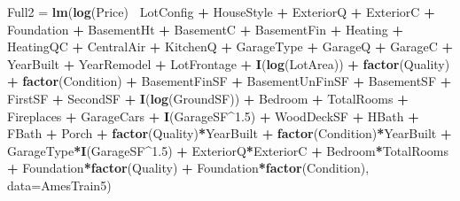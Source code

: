 \documentclass[
]{article}
\newenvironment{Shaded}{\begin{snugshade}}{\end{snugshade}}
\newcommand{\DataTypeTok}[1]{\textcolor[rgb]{0.13,0.29,0.53}{#1}}
\newcommand{\FloatTok}[1]{\textcolor[rgb]{0.00,0.00,0.81}{#1}}
\newcommand{\KeywordTok}[1]{\textcolor[rgb]{0.13,0.29,0.53}{\textbf{#1}}}
\newcommand{\NormalTok}[1]{#1}
\newcommand{\OperatorTok}[1]{\textcolor[rgb]{0.81,0.36,0.00}{\textbf{#1}}}
\newcommand{\StringTok}[1]{\textcolor[rgb]{0.31,0.60,0.02}{#1}}
\begin{document}
\begin{Shaded}
\begin{Highlighting}[]
\NormalTok{Full2 =}\StringTok{ }\KeywordTok{lm}\NormalTok{(}\KeywordTok{log}\NormalTok{(Price)}\OperatorTok{~}
\StringTok{            }\NormalTok{LotConfig }\OperatorTok{+}\StringTok{ }\NormalTok{HouseStyle }\OperatorTok{+}\StringTok{ }\NormalTok{ExteriorQ }\OperatorTok{+}\StringTok{ }\NormalTok{ExteriorC }\OperatorTok{+}\StringTok{ }\NormalTok{Foundation }\OperatorTok{+}\StringTok{ }\NormalTok{BasementHt }\OperatorTok{+}\StringTok{ }\NormalTok{BasementC }\OperatorTok{+}\StringTok{ }\NormalTok{BasementFin }\OperatorTok{+}\StringTok{ }\NormalTok{Heating }\OperatorTok{+}\StringTok{ }\NormalTok{HeatingQC }\OperatorTok{+}\StringTok{ }\NormalTok{CentralAir }\OperatorTok{+}\StringTok{ }\NormalTok{KitchenQ }\OperatorTok{+}\StringTok{ }\NormalTok{GarageType }\OperatorTok{+}\StringTok{ }\NormalTok{GarageQ }\OperatorTok{+}\StringTok{ }\NormalTok{GarageC }\OperatorTok{+}\StringTok{ }\NormalTok{YearBuilt }\OperatorTok{+}\StringTok{ }\NormalTok{YearRemodel }\OperatorTok{+}\StringTok{ }\NormalTok{LotFrontage }\OperatorTok{+}\StringTok{ }\KeywordTok{I}\NormalTok{(}\KeywordTok{log}\NormalTok{(LotArea)) }\OperatorTok{+}\StringTok{ }\KeywordTok{factor}\NormalTok{(Quality) }\OperatorTok{+}\StringTok{ }\KeywordTok{factor}\NormalTok{(Condition) }\OperatorTok{+}\StringTok{ }\NormalTok{BasementFinSF }\OperatorTok{+}\StringTok{ }\NormalTok{BasementUnFinSF }\OperatorTok{+}\StringTok{ }\NormalTok{BasementSF }\OperatorTok{+}\StringTok{ }\NormalTok{FirstSF }\OperatorTok{+}\StringTok{ }\NormalTok{SecondSF }\OperatorTok{+}\StringTok{ }\KeywordTok{I}\NormalTok{(}\KeywordTok{log}\NormalTok{(GroundSF)) }\OperatorTok{+}\StringTok{ }\NormalTok{Bedroom }\OperatorTok{+}\StringTok{ }\NormalTok{TotalRooms }\OperatorTok{+}\StringTok{ }\NormalTok{Fireplaces }\OperatorTok{+}\StringTok{ }\NormalTok{GarageCars }\OperatorTok{+}\StringTok{ }\KeywordTok{I}\NormalTok{(GarageSF}\OperatorTok{^}\FloatTok{1.5}\NormalTok{) }\OperatorTok{+}\StringTok{ }\NormalTok{WoodDeckSF }\OperatorTok{+}\StringTok{ }\NormalTok{HBath }\OperatorTok{+}\StringTok{ }\NormalTok{FBath }\OperatorTok{+}\StringTok{ }\NormalTok{Porch }\OperatorTok{+}\StringTok{ }\KeywordTok{factor}\NormalTok{(Quality)}\OperatorTok{*}\NormalTok{YearBuilt }\OperatorTok{+}\StringTok{ }\KeywordTok{factor}\NormalTok{(Condition)}\OperatorTok{*}\NormalTok{YearBuilt }\OperatorTok{+}\StringTok{ }\NormalTok{GarageType}\OperatorTok{*}\KeywordTok{I}\NormalTok{(GarageSF}\OperatorTok{^}\FloatTok{1.5}\NormalTok{) }\OperatorTok{+}\StringTok{ }\NormalTok{ExteriorQ}\OperatorTok{*}\NormalTok{ExteriorC }\OperatorTok{+}\StringTok{ }\NormalTok{Bedroom}\OperatorTok{*}\NormalTok{TotalRooms }\OperatorTok{+}\StringTok{ }\NormalTok{Foundation}\OperatorTok{*}\KeywordTok{factor}\NormalTok{(Quality) }\OperatorTok{+}\StringTok{ }\NormalTok{Foundation}\OperatorTok{*}\KeywordTok{factor}\NormalTok{(Condition), }\DataTypeTok{data=}\NormalTok{AmesTrain5)}
\end{Highlighting}
\end{Shaded}
\end{document}

